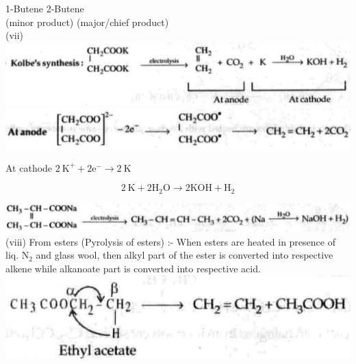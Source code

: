\documentclass[10pt]{article}
\begin{document}
1-Butene 2-Butene\\
(minor product) (major/chief product)\\
(vii)\\
\includegraphics[max width=\textwidth, center]{2025_01_28_8470952b98110cec3aabg-178(6)}\\
\includegraphics[max width=\textwidth, center]{2025_01_28_8470952b98110cec3aabg-178}

At cathode $2 \mathrm{~K}^{+}+2 \mathrm{e}^{-} \longrightarrow 2 \mathrm{~K}$

$$
2 \mathrm{~K}+2 \mathrm{H}_{2} \mathrm{O} \longrightarrow 2 \mathrm{KOH}+\mathrm{H}_{2}
$$

\includegraphics[max width=\textwidth, center]{2025_01_28_8470952b98110cec3aabg-178(3)}\\
(viii) From esters (Pyrolysis of esters) :- When esters are heated in presence of liq. $\mathrm{N}_{2}$ and glass wool, then alkyl part of the ester is converted into respective alkene while alkanoate part is converted into respective acid.\\
\includegraphics[max width=\textwidth, center]{2025_01_28_8470952b98110cec3aabg-179(2)}
\end{document}
